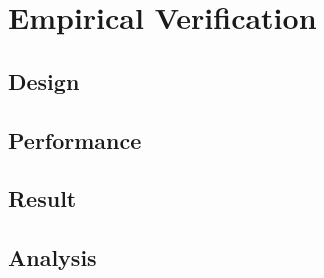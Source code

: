 \documentclass[conference,compsoc]{IEEEtran}
\begin{document}
\section{Empirical Verification}
  \subsection{Design}

  \subsection{Performance}

  \subsection{Result}

  \subsection{Analysis}



\cite{rivest1987game}
\cite{knuth1975analysis}
\end{document}
